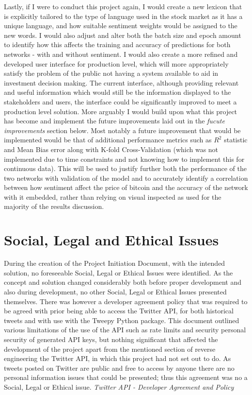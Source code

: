 \documentclass[oneside, 12pt]{article}
\begin{document}
	Lastly, if I were to conduct this project again, I would create a new lexicon that is explicitly tailored to the type of language used in the stock market as it has a unique language, and how suitable sentiment weights would be assigned to the new words. I would also adjust and alter both the batch size and epoch amount to identify how this affects the training and accuracy of predictions for both networks - with and without sentiment. I would also create a more refined and developed user interface for production level, which will more appropriately satisfy the problem of the public not having a system available to aid in investment decision making. The current interface, although providing relevant and useful information which would still be the information displayed to the stakeholders and users, the interface could be significantly improved to meet a production level solution. More arguably I would build upon what this project has become and implement the future improvements laid out in the \textit{fucute improvements} section below. Most notably a future improvement that would be implemented would be that of additional performance metrics such as $R^2$ statistic and Mean Bias error along with K-fold Cross-Validation (which was not implemented due to time constraints and not knowing how to implement this for continuous data). This will be used to justify further both the performance of the two networks with validation of the model and to accurately identify a correlation between how sentiment affect the price of bitcoin and the accuracy of the network with it embedded, rather than relying on visual inspected as used for the majority of the results discussion.
	
	\section{Social, Legal and Ethical Issues}
	During the creation of the Project Initiation Document, with the intended solution, no foreseeable Social, Legal or Ethical Issues were identified. As the concept and solution changed considerably both before proper development and also during development, no other Social, Legal or Ethical Issues presented themselves. There was however a developer agreement policy that was required to be agreed with prior being able to access the Twitter API, for both historical tweets and with use with the Tweepy Python package. This document outlined various limitations of the use of the API such as rate limits and security personal security of generated API keys, but nothing significant that affected the development of the project apart from the mentioned section of reverse engineering the Twitter API, in which this project had not set out to do. As tweets posted on Twitter are public and free to access by anyone there are no personal information issues that could be presented; thus this agreement was no a Social, Legal or Ethical issue. \textit{Twitter API - Developer Agreement and Policy} \cite{TwitterTerms}
	
\end{document}
